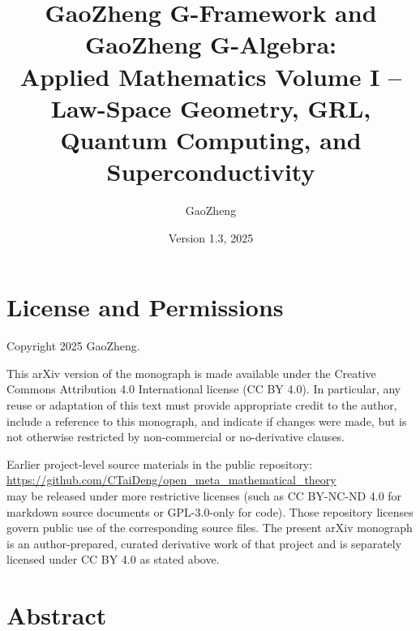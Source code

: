 \documentclass[11pt]{book}
\title{\textbf{GaoZheng G-Framework and GaoZheng G-Algebra:\\
Applied Mathematics Volume I -- Law-Space Geometry, GRL, Quantum Computing, and Superconductivity}}
\author{GaoZheng}
\date{Version 1.3, 2025}
\theoremstyle{plain}
\theoremstyle{definition}
\theoremstyle{remark}
\begin{document}
\raggedbottom 

\maketitle

\frontmatter

\chapter*{License and Permissions}


Copyright \textcopyright{} 2025 GaoZheng.

This arXiv version of the monograph is made available under the
Creative Commons Attribution 4.0 International license (CC BY 4.0).
In particular, any reuse or adaptation of this text must provide
appropriate credit to the author, include a reference to this
monograph, and indicate if changes were made, but is not otherwise
restricted by non-commercial or no-derivative clauses.

Earlier project-level source materials in the public repository: \\
\url{https://github.com/CTaiDeng/open_meta_mathematical_theory} \\
may be released under more restrictive licenses (such as
CC BY-NC-ND 4.0 for markdown source documents or GPL-3.0-only for
code). Those repository licenses govern public use of the
corresponding source files. The present arXiv monograph is an
author-prepared, curated derivative work of that project and is
separately licensed under CC BY 4.0 as stated above.


\chapter*{Abstract}
\end{document}
